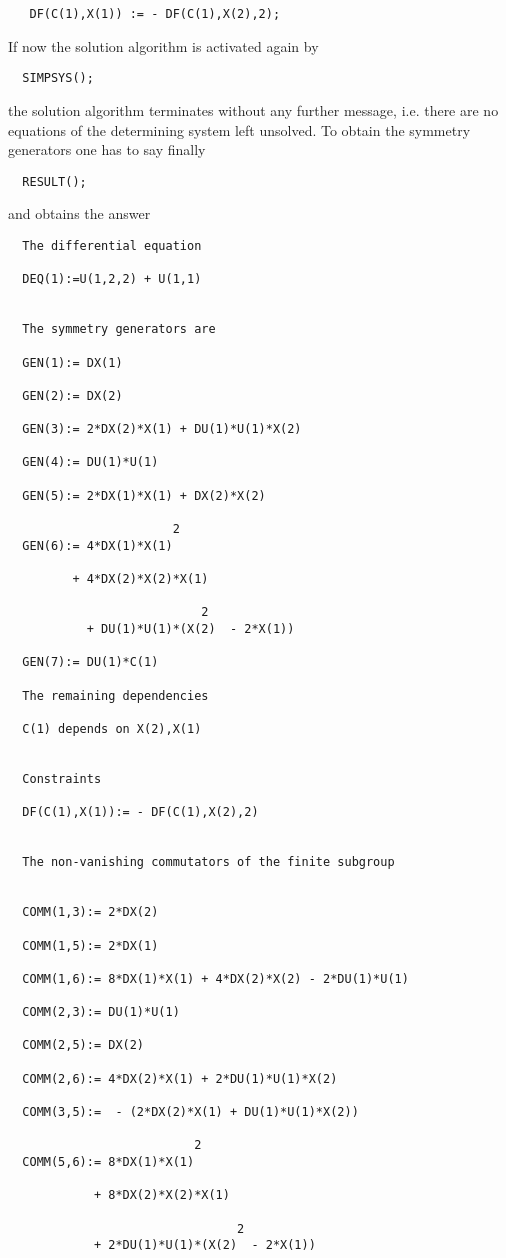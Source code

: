 \begin{verbatim}
   DF(C(1),X(1)) := - DF(C(1),X(2),2);
\end{verbatim}

If now the solution algorithm is activated again by

\begin{verbatim}
  SIMPSYS();
\end{verbatim}

the solution algorithm terminates without any further message, i.e.
there are no equations of the determining system left unsolved. To
obtain the symmetry generators one has to say finally

\begin{verbatim}
  RESULT();
\end{verbatim}

and obtains the answer

\begin{verbatim}
  The differential equation

  DEQ(1):=U(1,2,2) + U(1,1)


  The symmetry generators are

  GEN(1):= DX(1)

  GEN(2):= DX(2)

  GEN(3):= 2*DX(2)*X(1) + DU(1)*U(1)*X(2)

  GEN(4):= DU(1)*U(1)

  GEN(5):= 2*DX(1)*X(1) + DX(2)*X(2)

                       2
  GEN(6):= 4*DX(1)*X(1)

         + 4*DX(2)*X(2)*X(1)

                           2
           + DU(1)*U(1)*(X(2)  - 2*X(1))

  GEN(7):= DU(1)*C(1)

  The remaining dependencies

  C(1) depends on X(2),X(1)


  Constraints

  DF(C(1),X(1)):= - DF(C(1),X(2),2)


  The non-vanishing commutators of the finite subgroup


  COMM(1,3):= 2*DX(2)

  COMM(1,5):= 2*DX(1)

  COMM(1,6):= 8*DX(1)*X(1) + 4*DX(2)*X(2) - 2*DU(1)*U(1)

  COMM(2,3):= DU(1)*U(1)

  COMM(2,5):= DX(2)

  COMM(2,6):= 4*DX(2)*X(1) + 2*DU(1)*U(1)*X(2)

  COMM(3,5):=  - (2*DX(2)*X(1) + DU(1)*U(1)*X(2))

                          2
  COMM(5,6):= 8*DX(1)*X(1)

            + 8*DX(2)*X(2)*X(1)

                                2
            + 2*DU(1)*U(1)*(X(2)  - 2*X(1))
\end{verbatim}

